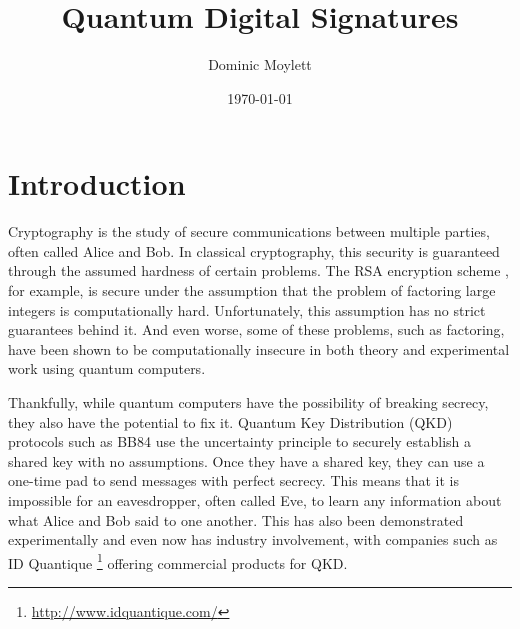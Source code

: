 \documentclass[%
 reprint,
 amsmath,amssymb,
 aps,
 pra,
]{revtex4-1}
\begin{document}
\title{Quantum Digital Signatures}

\author{Dominic Moylett}
%

\date{\today}%

\maketitle


\section{Introduction}

Cryptography is the study of secure communications between multiple parties, often called Alice and Bob. In classical cryptography, this security is guaranteed through the assumed hardness of certain problems. The RSA encryption scheme \cite{Rivest:1978:MOD:359340.359342}, for example, is secure under the assumption that the problem of factoring large integers is computationally hard. Unfortunately, this assumption has no strict guarantees behind it. And even worse, some of these problems, such as factoring, have been shown to be computationally insecure in both theory \cite{Shor97} and experimental work \cite{MLL+12, 1604.05796} using quantum computers.

Thankfully, while quantum computers have the possibility of breaking secrecy, they also have the potential to fix it. Quantum Key Distribution (QKD) protocols such as BB84 \citep{BB84} use the uncertainty principle to securely establish a shared key with no assumptions. Once they have a shared key, they can use a one-time pad to send messages with perfect secrecy. This means that it is impossible for an eavesdropper, often called Eve, to learn any information about what Alice and Bob said to one another. This has also been demonstrated experimentally \cite{Bennett1992} and even now has industry involvement, with companies such as ID Quantique \footnote{\url{http://www.idquantique.com/}} offering commercial products for QKD.
\end{document}
